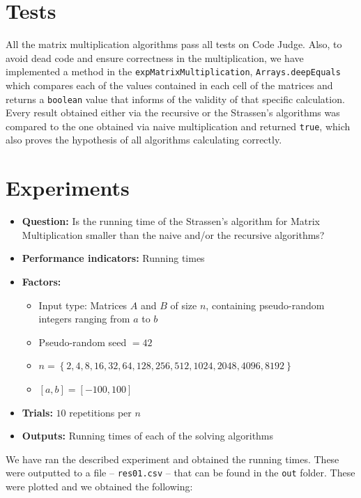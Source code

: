\documentclass{tufte-handout}
\begin{document}
\section{Tests}
All the matrix multiplication algorithms pass all tests on Code Judge. Also, to avoid dead code and ensure correctness in the multiplication, we have implemented a method in the {\tt expMatrixMultiplication}, {\tt Arrays.deepEquals} which compares each of the values contained in each cell of the matrices and returns a {\tt boolean} value that informs of the validity of that specific calculation. Every result obtained either via the recursive or the Strassen's algorithms was compared to the one obtained via naive multiplication and returned {\tt true}, which also proves the hypothesis of all algorithms calculating correctly.\\

\section{Experiments}
\begin{tcolorbox}
\begin{itemize}
\item {\bf Question:} Is the running time of the Strassen's algorithm for Matrix Multiplication smaller than the naive and/or the recursive algorithms?
\item {\bf Performance indicators:} Running times
\item {\bf Factors:}
\begin{itemize}
  \item Input type: Matrices $A$ and $B$ of size $n$, containing pseudo-random integers ranging from $a$ to $b$
  \item Pseudo-random seed $= 42$
  \item $n = \left\{2,4,8,16,32,64,128,256,512,1024,2048,4096,8192\right\}$
  \item $[a,b] = [-100, 100]$
\end{itemize}
\item {\bf Trials: } $10$ repetitions per $n$
\item {\bf Outputs:} Running times of each of the solving algorithms
\end{itemize}
\end{tcolorbox}

\noindent
We have ran the described experiment and obtained the running times. These were outputted to a file -- {\tt res01.csv} -- that can be found in the {\tt out} folder. These were plotted and we obtained the following:
\end{document}
